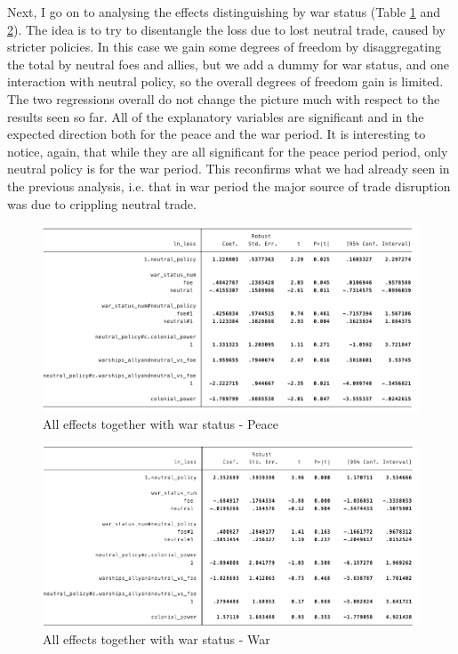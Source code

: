 \documentclass[12pt,a4paper,notitlepage,english]{article}
\begin{document}
Next, I go on to analysing the effects distinguishing by war status (Table \ref{effects_together_warstatus_peace} and \ref{effects_together_warstatus_war}). The idea is to try to disentangle the loss due to lost neutral trade, caused by stricter policies. In this case we gain some degrees of freedom by disaggregating the total by neutral foes and allies, but we add a dummy for  war status, and one interaction with neutral policy, so the overall degrees of freedom gain is limited. The two regressions overall do not change the picture much with respect to the results seen so far. All of the explanatory variables are significant and in the expected direction both for the peace and the war period. It is interesting to notice, again, that while they are all significant for the peace period period, only neutral policy is for the war period. This reconfirms what we had already seen in the previous analysis, i.e. that in war period the major source of trade disruption was due to crippling neutral trade. 
\begin{figure}
\centering
\caption{All effects together with war status - Peace}
\label{effects_together_warstatus_peace}
\includegraphics[scale=.55]{reg5}
\end{figure}
\begin{figure}
\centering
\caption{All effects together with war status - War}
\label{effects_together_warstatus_war}
\includegraphics[scale=.55]{reg6}
\end{figure}
\end{document}
